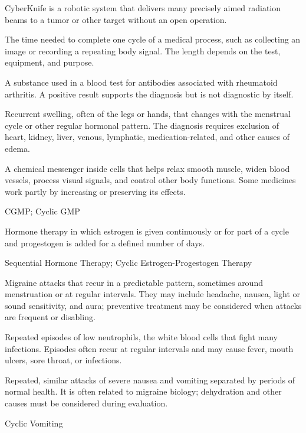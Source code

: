  CyberKnife is a robotic system that delivers many precisely aimed radiation beams to a tumor or other target without an open operation.

 The time needed to complete one cycle of a medical process, such as collecting an image or recording a repeating body signal. The length depends on the test, equipment, and purpose.

 A substance used in a blood test for antibodies associated with rheumatoid arthritis. A positive result supports the diagnosis but is not diagnostic by itself.

 Recurrent swelling, often of the legs or hands, that changes with the menstrual cycle or other regular hormonal pattern. The diagnosis requires exclusion of heart, kidney, liver, venous, lymphatic, medication-related, and other causes of edema.

 A chemical messenger inside cells that helps relax smooth muscle, widen blood vessels, process visual signals, and control other body functions. Some medicines work partly by increasing or preserving its effects.

\synonyms
CGMP; Cyclic GMP

 Hormone therapy in which estrogen is given continuously or for part of a cycle and progestogen is added for a defined number of days.

\synonyms
Sequential Hormone Therapy; Cyclic Estrogen-Progestogen Therapy

 Migraine attacks that recur in a predictable pattern, sometimes around menstruation or at regular intervals. They may include headache, nausea, light or sound sensitivity, and aura; preventive treatment may be considered when attacks are frequent or disabling.

 Repeated episodes of low neutrophils, the white blood cells that fight many infections. Episodes often recur at regular intervals and may cause fever, mouth ulcers, sore throat, or infections.

 Repeated, similar attacks of severe nausea and vomiting separated by periods of normal health. It is often related to migraine biology; dehydration and other causes must be considered during evaluation.

\synonyms
Cyclic Vomiting

